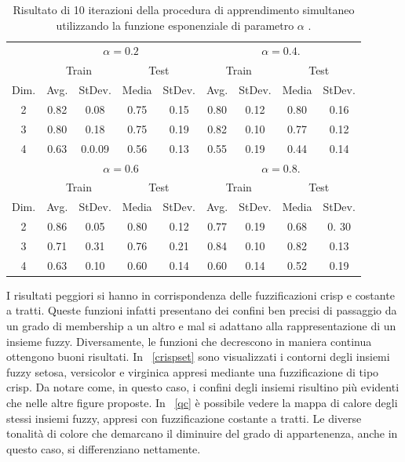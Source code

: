 \documentclass [11pt,a4paper,twoside,openright] {book}
\begin{document}
\begin{table}[!tb]
\caption{Risultato di 10 iterazioni della procedura di apprendimento simultaneo utilizzando la funzione esponenziale di parametro $\alpha$ \label{ef}.}
\begin{tabular}{|c|c|c|c|c|c|c|c|c|}
\hline
& \multicolumn{4}{|c|}{$\alpha=0.2$} & \multicolumn{4}{|c|}{$\alpha=0.4$.}\\
\cline{2-9}
& \multicolumn{2}{|c|}{Train} & \multicolumn{2}{|c|}{Test} & \multicolumn{2}{|c|}{Train} & \multicolumn{2}{|c|}{Test}\\
\hline
Dim. & Avg. & StDev. & Media & StDev. & Avg. & StDev. & Media & StDev. \\
\hline
2 & 0.82 & 0.08 & 0.75 & 0.15 & 0.80 & 0.12 & 0.80 & 0.16 \\
3 & 0.80 & 0.18 & 0.75 & 0.19 & 0.82 & 0.10 & 0.77 & 0.12 \\
4 & 0.63 & 0.0.09 & 0.56 & 0.13 & 0.55 & 0.19 & 0.44 & 0.14 \\
\hline
\hline
& \multicolumn{4}{|c|}{$\alpha=0.6$} & \multicolumn{4}{|c|}{$\alpha=0.8$.}\\
\cline{2-9}
& \multicolumn{2}{|c|}{Train} & \multicolumn{2}{|c|}{Test} & \multicolumn{2}{|c|}{Train} & \multicolumn{2}{|c|}{Test}\\
\hline
Dim. & Avg. & StDev. & Media & StDev. & Avg. & StDev. & Media & StDev. \\
\hline
2 & 0.86 & 0.05 & 0.80 & 0.12 & 0.77 & 0.19 & 0.68 & 0. 30\\
3 & 0.71 & 0.31 & 0.76 & 0.21 & 0.84 & 0.10 & 0.82 & 0.13 \\
4 & 0.63 & 0.10 & 0.60 & 0.14 & 0.60 & 0.14 & 0.52 & 0.19 \\
\hline
\end{tabular}
\end{table}I risultati peggiori si hanno in corrispondenza delle fuzzificazioni crisp e costante a tratti. Queste funzioni infatti presentano dei confini ben precisi di passaggio da un grado di membership a un altro e mal si adattano alla rappresentazione di un insieme fuzzy. Diversamente, le funzioni che decrescono in maniera continua ottengono buoni risultati. In \figurename~\ref{crispset} sono visualizzati i contorni degli insiemi fuzzy setosa, versicolor e virginica appresi mediante una fuzzificazione di tipo crisp. Da notare come, in questo caso, i confini degli insiemi risultino più evidenti che nelle altre figure proposte. In \figurename~\ref{qc} è possibile vedere la mappa di calore degli stessi insiemi fuzzy, appresi con fuzzificazione costante a tratti. Le diverse tonalità di colore che demarcano il diminuire del grado di appartenenza, anche in questo caso, si differenziano nettamente. 
\end{document}
